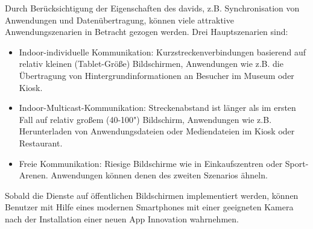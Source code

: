 Durch Berücksichtigung der Eigenschaften des \gls{david}s, z.B. Synchronisation von Anwendungen und Datenübertragung, können viele attraktive Anwendungszenarien in Betracht gezogen werden. Drei Hauptszenarien sind: 

\begin{itemize}
  \item Indoor-individuelle Kommunikation: Kurzstreckenverbindungen basierend auf relativ kleinen (Tablet-Größe) Bildschirmen, Anwendungen wie z.B. die Übertragung von Hintergrundinformationen an Besucher im Museum oder Kiosk.
  \item Indoor-Multicast-Kommunikation: Streckenabstand ist länger als im ersten Fall auf relativ großem (40-100") Bildschirm, Anwendungen wie z.B. Herunterladen von Anwendungsdateien oder Mediendateien im Kiosk oder Restaurant.
  \item Freie Kommunikation: Riesige Bildschirme wie in Einkaufszentren oder Sport-Arenen. Anwendungen können denen des zweiten Szenarios ähneln.
\end{itemize}

Sobald die Dienste auf öffentlichen Bildschirmen implementiert werden, können Benutzer mit Hilfe eines modernen Smartphones mit einer geeigneten Kamera nach der Installation einer neuen App Innovation wahrnehmen.





















